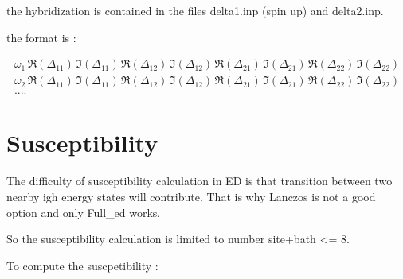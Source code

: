 \documentclass{book}
\def\D{\Delta}
\def\w{\omega}
\begin{document}
the hybridization is contained in the files delta1.inp (spin up) and delta2.inp.

the format is :

\begin{align}
  \w_1 \, \Re(\D_{11}) \,  \Im(\D_{11})\,  \Re(\D_{12}) \, \Im(\D_{12})\,  \Re(\D_{21}) \, \Im(\D_{21}) \, \Re(\D_{22}) \, \Im(\D_{22}) \nonumber\\
  \w_2 \, \Re(\D_{11}) \,  \Im(\D_{11})\,  \Re(\D_{12}) \, \Im(\D_{12})\,  \Re(\D_{21}) \, \Im(\D_{21}) \, \Re(\D_{22}) \, \Im(\D_{22}) \nonumber\\
  .... \nonumber
\end{align}




\section{Susceptibility}


The difficulty of susceptibility calculation in ED is that transition between two nearby igh energy states  will contribute. That is why Lanczos is not a good option and only Full\_ed works.

So the susceptibility calculation is limited to number site+bath <= 8.

To compute the suscpetibility :
\end{document}
